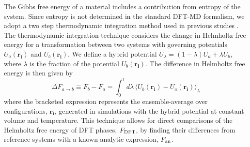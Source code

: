 The Gibbs free energy of a material includes a contribution from entropy of the system.
Since entropy is not determined in the standard DFT-MD formalism, we adopt a two step
thermodynamic integration method used in previous studies
\citep{Wilson2010,Wilson2012a,Wahl2013,Gonzalez2014}.  The thermodynamic integration technique
considers the change in Helmholtz free energy for a transformation between two systems
with governing potentials $U_a\left(\mathbf{r_i}\right)$ and
$U_b\left(\mathbf{r_i}\right)$. We define a hybrid potential
$U_{\lambda}=\left(1-\lambda\right)U_a+\lambda U_b$, where $\lambda$ is the fraction of
the potential $U_b\left(\mathbf{r_i}\right)$. The difference in Helmholtz free energy is
then given by
\begin{equation} \label{eqn:td_int}
  \Delta F_{a\to b}\equiv F_b - F_a = \int_{0}^{1}{d\lambda\,\langle U_b\left(\mathbf{r_i}\right) -
  U_a\left(\mathbf{r_i}\right) \rangle_{\lambda}}
\end{equation}
where the bracketed expression represents the ensemble-average over configurations,
$\mathbf{r_i}$, generated in simulations with the hybrid potential at constant volume and
temperature. This technique allows for direct comparisons of the Helmholtz free energy of
DFT phases, $F_{\rm DFT}$, by finding their differences from reference systems with a known
analytic expression, $F_{\rm an}$. 

